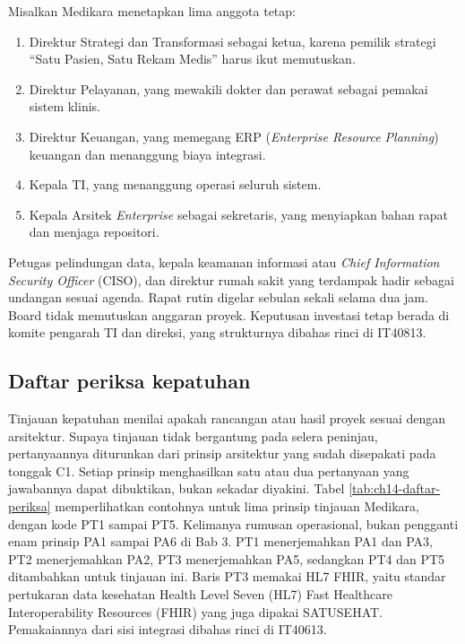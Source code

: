Misalkan Medikara menetapkan lima anggota tetap:

\begin{enumerate}
  \item Direktur Strategi dan Transformasi sebagai ketua, karena pemilik
        strategi ``Satu Pasien, Satu Rekam Medis'' harus ikut memutuskan.
  \item Direktur Pelayanan, yang mewakili dokter dan perawat sebagai
        pemakai sistem klinis.
  \item Direktur Keuangan, yang memegang ERP (\textit{Enterprise Resource
        Planning}) keuangan dan menanggung biaya integrasi.
  \item Kepala TI, yang menanggung operasi seluruh sistem.
  \item Kepala Arsitek \textit{Enterprise} sebagai sekretaris, yang
        menyiapkan bahan rapat dan menjaga repositori.
\end{enumerate}

Petugas pelindungan data, kepala keamanan informasi atau \textit{Chief
Information Security Officer} (CISO), dan direktur rumah sakit yang terdampak
hadir sebagai undangan sesuai agenda. Rapat rutin
digelar sebulan sekali selama dua jam. Board tidak memutuskan anggaran
proyek. Keputusan investasi tetap berada di komite pengarah TI dan direksi,
yang strukturnya dibahas rinci di IT40813.

\subsection*{Daftar periksa kepatuhan}

Tinjauan kepatuhan menilai apakah rancangan atau hasil proyek sesuai dengan
arsitektur. Supaya tinjauan tidak bergantung pada selera peninjau,
pertanyaannya diturunkan dari prinsip arsitektur yang sudah disepakati pada
tonggak C1. Setiap prinsip menghasilkan satu atau dua pertanyaan yang
jawabannya dapat dibuktikan, bukan sekadar diyakini. Tabel
\ref{tab:ch14-daftar-periksa} memperlihatkan contohnya untuk lima prinsip
tinjauan Medikara, dengan kode PT1 sampai PT5. Kelimanya rumusan operasional,
bukan pengganti enam prinsip PA1 sampai PA6 di Bab 3. PT1 menerjemahkan PA1
dan PA3, PT2 menerjemahkan PA2, PT3 menerjemahkan PA5, sedangkan PT4 dan PT5
ditambahkan untuk tinjauan ini. Baris PT3 memakai HL7 FHIR, yaitu standar pertukaran data
kesehatan Health Level Seven (HL7) Fast Healthcare Interoperability
Resources (FHIR) yang juga dipakai SATUSEHAT. Pemakaiannya dari sisi
integrasi dibahas rinci di IT40613.

